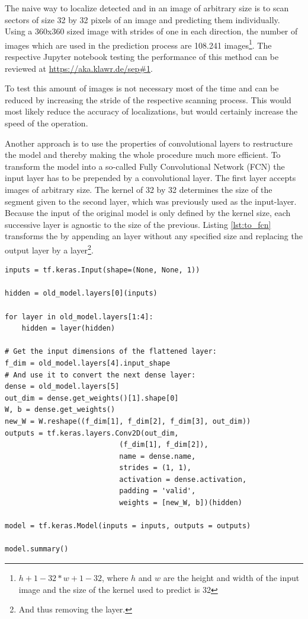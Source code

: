 The naive way to localize detected  and  in an image of arbitrary size is to scan sectors of size 32 by 32 pixels of an image and predicting them individually.
Using a 360x360 sized image with strides of one in each direction, the number of images which are used in the prediction process are 108.241 images\footnote{$h + 1 - 32 * w + 1 - 32$, where $h$ and $w$ are the height and width of the input image and the size of the kernel used to predict is 32}.
The respective Jupyter notebook testing the performance of this method can be reviewed at \url{https://aka.klawr.de/sep#1}. %

To test this amount of images is not necessary most of the time and can be reduced by increasing the stride of the respective scanning process.
This would most likely reduce the accuracy of localizations, but would certainly increase the speed of the operation.

Another approach is to use the properties of convolutional layers to restructure the model and thereby making the whole procedure much more efficient.
To transform the model into a so-called Fully Convolutional Network (FCN) the input layer has to be prepended by a convolutional layer.
The first layer accepts images of arbitrary size.
The kernel of 32 by 32 determines the size of the segment given to the second layer, which was previously used as the input-layer.
Because the input of the original model is only defined by the kernel size, each successive layer is agnostic to the size of the previous.
Listing \ref{lst:to_fcn} transforms the  by appending an  layer without any specified size and replacing the output layer by a  layer\footnote{And thus removing the  layer.}.

\begin{lstlisting}[caption={Transformation of the Symbol Classifier into a FCN.}, label=lst:to_fcn]
inputs = tf.keras.Input(shape=(None, None, 1))

hidden = old_model.layers[0](inputs)

for layer in old_model.layers[1:4]:
    hidden = layer(hidden)

# Get the input dimensions of the flattened layer:
f_dim = old_model.layers[4].input_shape
# And use it to convert the next dense layer:
dense = old_model.layers[5]
out_dim = dense.get_weights()[1].shape[0]
W, b = dense.get_weights()
new_W = W.reshape((f_dim[1], f_dim[2], f_dim[3], out_dim))
outputs = tf.keras.layers.Conv2D(out_dim,
                           (f_dim[1], f_dim[2]),
                           name = dense.name,
                           strides = (1, 1),
                           activation = dense.activation,
                           padding = 'valid',
                           weights = [new_W, b])(hidden)

model = tf.keras.Model(inputs = inputs, outputs = outputs)

model.summary()
\end{lstlisting}


